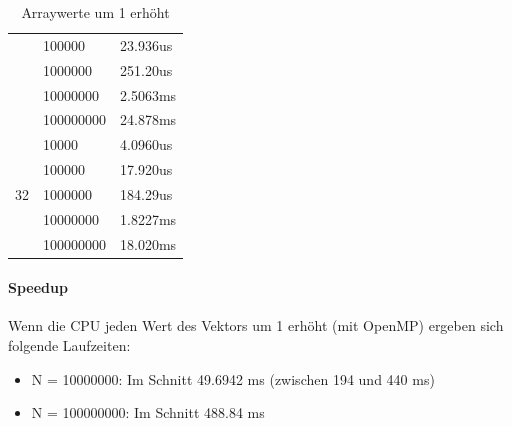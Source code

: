 \documentclass{report}
\begin{document}
\begin{table}
\begin{tabular}{|c|l|l|}
		& 100000    & 23.936us                                                                                   \\ \cline{2-3} 
		& 1000000   & 251.20us                                                                                  \\ \cline{2-3} 
		& 10000000  & 2.5063ms                                                                                  \\ \cline{2-3} 
		& 100000000 & 24.878ms                                                                                 \\ \hline
		\multirow{5}{*}{32}             & 10000     & 4.0960us                                                                                   \\ \cline{2-3} 
		& 100000    & 17.920us                                                                                   \\ \cline{2-3} 
		& 1000000   & 184.29us                                                                                   \\ \cline{2-3} 
		& 10000000  & 1.8227ms                                                                                   \\ \cline{2-3} 
		& 100000000 & 18.020ms                                                                                  \\ \hline
	\end{tabular}
	\caption{Arraywerte um 1 erhöht}
	\label{Table:2_2Erhoehen}
\end{table}

\paragraph{Speedup} 
Wenn die CPU jeden Wert des Vektors um 1 erhöht (mit OpenMP) ergeben sich folgende Laufzeiten:\\
\begin{itemize}
	\item N = 10000000:  Im Schnitt 49.6942 ms (zwischen 194 und 440 ms)
	\item N = 100000000: Im Schnitt 488.84 ms
\end{itemize}
\end{document}
